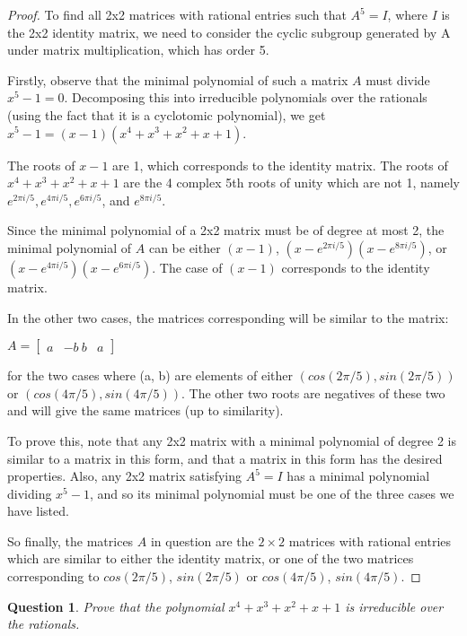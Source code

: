 \documentclass{amsart}
\theoremstyle{plain}
\newtheorem{question}{Question}
\begin{document}
\begin{proof}To find all 2x2 matrices with rational entries such that $A^5 = I$, where $I$ is the 2x2 identity matrix, we need to consider the cyclic subgroup generated by A under matrix multiplication, which has order 5.

Firstly, observe that the minimal polynomial of such a matrix $A$ must divide $x^5 - 1 = 0$.
Decomposing this into irreducible polynomials over the rationals (using the fact that it is a cyclotomic polynomial), we get $x^5 - 1 = (x-1)(x^4 + x^3 + x^2 + x + 1)$.

The roots of $x-1$ are 1, which corresponds to the identity matrix. The roots of $x^4 + x^3 + x^2 + x + 1$ are the 4 complex 5th roots of unity which are not 1, namely $e^{2\pi i / 5}, e^{4\pi i / 5}, e^{6\pi i / 5}$, and $e^{8\pi i / 5}$.

Since the minimal polynomial of a 2x2 matrix must be of degree at most 2, the minimal polynomial of $A$ can be either $(x-1)$, $(x - e^{2\pi i / 5})(x - e^{8\pi i / 5})$, or $(x - e^{4\pi i / 5})(x - e^{6\pi i / 5})$. The case of $(x-1)$ corresponds to the identity matrix.

In the other two cases, the matrices corresponding will be similar to the matrix:

$A = \begin{bmatrix}
a & -b\
b & a
\end{bmatrix}$

for the two cases where (a, b) are elements of either $(cos(2\pi/5), sin(2\pi/5))$ or $(cos(4\pi/5), sin(4\pi/5))$. The other two roots are negatives of these two and will give the same matrices (up to similarity).

To prove this, note that any 2x2 matrix with a minimal polynomial of degree 2 is similar to a matrix in this form, and that a matrix in this form has the desired properties. Also, any 2x2 matrix satisfying $A^5 = I$ has a minimal polynomial dividing $x^5 - 1$, and so its minimal polynomial must be one of the three cases we have listed.

So finally, the matrices $A$ in question are the $2 \times 2$ matrices with rational entries which are similar to either the identity matrix, or one of the two matrices corresponding to $cos(2\pi/5)$, $sin(2\pi/5)$ or $cos(4\pi/5)$, $sin(4\pi/5)$.
\end{proof}


\begin{question}
    Prove that the polynomial $x^4 + x^3 + x^2 + x + 1$ is irreducible over the rationals.
\end{question}
\end{document}

